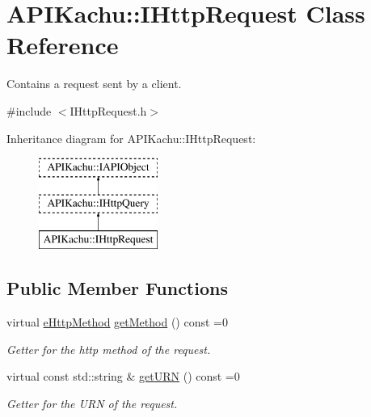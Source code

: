\hypertarget{class_a_p_i_kachu_1_1_i_http_request}{}\section{A\+P\+I\+Kachu\+:\+:I\+Http\+Request Class Reference}
\label{class_a_p_i_kachu_1_1_i_http_request}


Contains a request sent by a client.  




{\ttfamily \#include $<$I\+Http\+Request.\+h$>$}

Inheritance diagram for A\+P\+I\+Kachu\+:\+:I\+Http\+Request\+:\begin{figure}[H]
\begin{center}
\leavevmode
\includegraphics[height=3.000000cm]{class_a_p_i_kachu_1_1_i_http_request}
\end{center}
\end{figure}
\subsection*{Public Member Functions}
\begin{DoxyCompactItemize}
\item 
virtual \hyperlink{namespace_a_p_i_kachu_aeff09045bb4c289dc6f23d46950d830e}{e\+Http\+Method} \hyperlink{class_a_p_i_kachu_1_1_i_http_request_a95846739542dcccdd6cb8241192be350}{get\+Method} () const  =0
\begin{DoxyCompactList}\small\item\em Getter for the http method of the request. \end{DoxyCompactList}\item 
virtual const std\+::string \& \hyperlink{class_a_p_i_kachu_1_1_i_http_request_a32e5c6e709b6f753597f1364beb9e6c4}{get\+U\+RN} () const  =0\hypertarget{class_a_p_i_kachu_1_1_i_http_request_a32e5c6e709b6f753597f1364beb9e6c4}{}\label{class_a_p_i_kachu_1_1_i_http_request_a32e5c6e709b6f753597f1364beb9e6c4}

\begin{DoxyCompactList}\small\item\em Getter for the U\+RN of the request. \end{DoxyCompactList}\end{DoxyCompactItemize}
